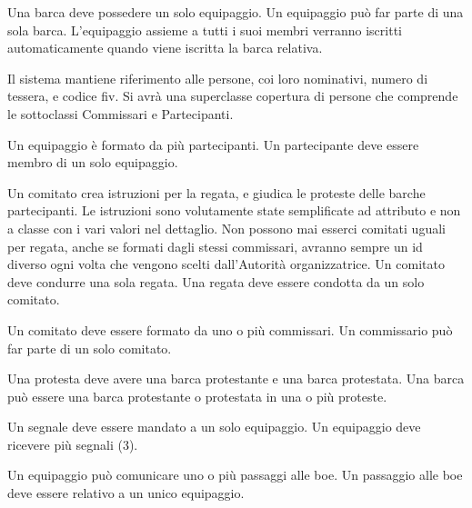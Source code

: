 \documentclass{article}
\begin{document}
\begin{flushleft}
Una barca deve possedere un solo equipaggio.
Un equipaggio può far parte di una sola barca.
L'equipaggio assieme a tutti i suoi membri verranno iscritti automaticamente quando viene iscritta la barca relativa.
\end{flushleft}

\begin{flushleft}
Il sistema mantiene riferimento alle persone, coi loro nominativi, numero di tessera, e codice fiv. Si avrà una superclasse copertura di persone che comprende le sottoclassi Commissari e Partecipanti.
\end{flushleft}

\begin{flushleft}
Un equipaggio è formato da più partecipanti.
Un partecipante deve essere membro di un solo equipaggio.
\end{flushleft}

\begin{flushleft}
Un comitato crea istruzioni per la regata, e giudica le proteste delle barche partecipanti.
Le istruzioni sono volutamente state semplificate ad attributo e non a classe con i vari valori nel dettaglio. 
Non possono mai esserci comitati uguali per regata, anche se formati dagli stessi commissari, avranno sempre un id diverso ogni volta che vengono scelti dall'Autorità organizzatrice.
Un comitato deve condurre una sola regata.
Una regata deve essere condotta da un solo comitato.
\end{flushleft}

\begin{flushleft}
Un comitato deve essere formato da uno o più commissari.
Un commissario può far parte di un solo comitato.
\end{flushleft}

\begin{flushleft}
Una protesta deve avere una barca protestante e una barca protestata.
Una barca può essere una barca protestante o protestata in una o più proteste.
\end{flushleft}

\begin{flushleft}
Un segnale deve essere mandato a un solo equipaggio.
Un equipaggio deve ricevere più segnali (3).
\end{flushleft}

\begin{flushleft}
Un equipaggio può comunicare uno o più passaggi alle boe.
Un passaggio alle boe deve essere relativo a un unico equipaggio.
\end{flushleft}
\end{document}
